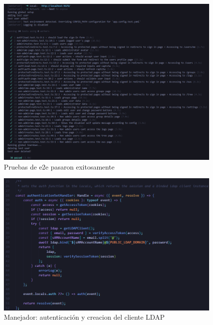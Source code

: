 \begin{figure}[H]
    \centering
    \includegraphics[width=\linewidth]{images/playwright tests run successfully.png}
    \caption{Pruebas de e2e pasaron exitosamente}
    \label{fig:e2e-test-run-ok}
\end{figure}


\begin{figure}[H]
    \centering
    \includegraphics[width=\textwidth]{images/code/authenticationSetHandler.png}
    \caption{Manejador: autenticación y creacion del cliente LDAP}
    \label{fig:authentication-set-handler}
\end{figure}

